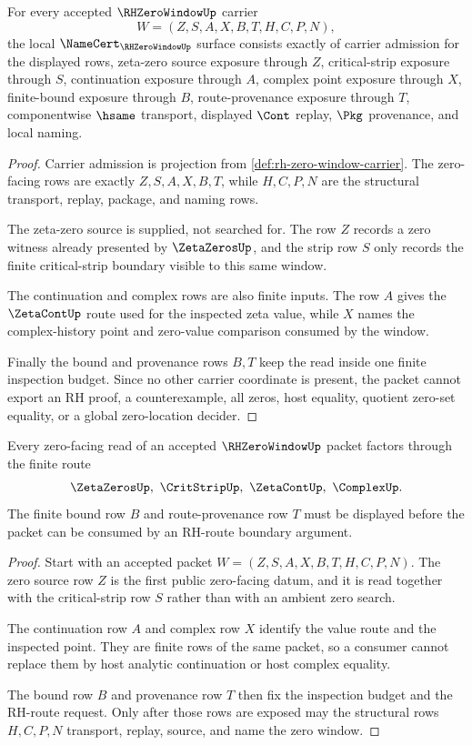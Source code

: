\begin{theorem}
\label{thm:rh-zero-window-namecert-obligations}
For every accepted $\RHZeroWindowUp$ carrier
$$
W=(Z,S,A,X,B,T,H,C,P,N),
$$
the local $\NameCert_{\RHZeroWindowUp}$ surface consists exactly of carrier
admission for the displayed rows, zeta-zero source exposure through $Z$,
critical-strip exposure through $S$, continuation exposure through $A$,
complex point exposure through $X$, finite-bound exposure through $B$,
route-provenance exposure through $T$, componentwise $\hsame$ transport,
displayed $\Cont$ replay, $\Pkg$ provenance, and local naming.
\end{theorem}
\begin{proof}
Carrier admission is projection from \autoref{def:rh-zero-window-carrier}.
The zero-facing rows are exactly $Z,S,A,X,B,T$, while $H,C,P,N$ are the
structural transport, replay, package, and naming rows.

The zeta-zero source is supplied, not searched for. The row $Z$ records a
zero witness already presented by $\ZetaZerosUp$, and the strip row $S$ only
records the finite critical-strip boundary visible to this same window.

The continuation and complex rows are also finite inputs. The row $A$ gives
the $\ZetaContUp$ route used for the inspected zeta value, while $X$ names
the complex-history point and zero-value comparison consumed by the window.

Finally the bound and provenance rows $B,T$ keep the read inside one finite
inspection budget. Since no other carrier coordinate is present, the packet
cannot export an RH proof, a counterexample, all zeros, host equality,
quotient zero-set equality, or a global zero-location decider.
\end{proof}

\begin{theorem}
\label{thm:rh-zero-window-zeta-source-route}
Every zero-facing read of an accepted $\RHZeroWindowUp$ packet factors through
the finite route
$$
\ZetaZerosUp,\ \CritStripUp,\ \ZetaContUp,\ \ComplexUp .
$$
The finite bound row $B$ and route-provenance row $T$ must be displayed
before the packet can be consumed by an RH-route boundary argument.
\end{theorem}
\begin{proof}
Start with an accepted packet $W=(Z,S,A,X,B,T,H,C,P,N)$. The zero source row
$Z$ is the first public zero-facing datum, and it is read together with the
critical-strip row $S$ rather than with an ambient zero search.

The continuation row $A$ and complex row $X$ identify the value route and
the inspected point. They are finite rows of the same packet, so a consumer
cannot replace them by host analytic continuation or host complex equality.

The bound row $B$ and provenance row $T$ then fix the inspection budget and
the RH-route request. Only after those rows are exposed may the structural
rows $H,C,P,N$ transport, replay, source, and name the zero window.
\end{proof}

